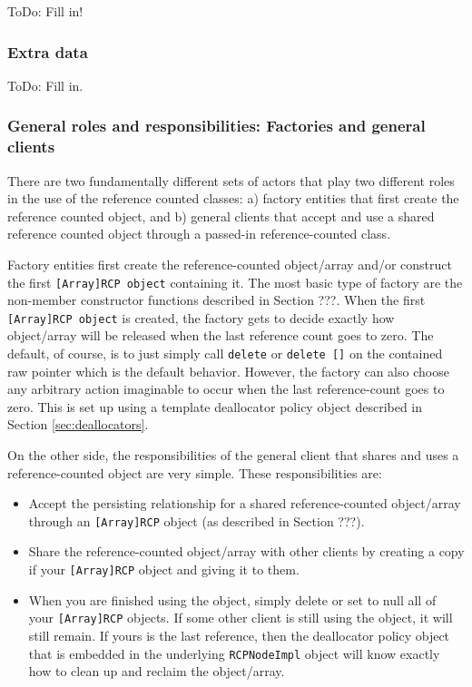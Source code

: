 \documentclass[pdf,ps2pdf,11pt]{SANDreport}
\begin{document}
ToDo: Fill in!


%
{}\subsubsection{Extra data}
\label{sec:extra-data}
%

ToDo: Fill in.


%
{}\subsubsection{General roles and responsibilities: Factories and
general clients}
%

There are two fundamentally different sets of actors that play two
different roles in the use of the reference counted classes: a)
factory entities that first create the reference counted object, and
b) general clients that accept and use a shared reference counted
object through a passed-in reference-counted class.

Factory entities first create the reference-counted object/array
and/or construct the first {}\texttt{[Array]RCP object} containing it.
The most basic type of factory are the non-member constructor
functions described in Section ???.  When the first
{}\texttt{[Array]RCP object} is created, the factory gets to decide
exactly how object/array will be released when the last reference
count goes to zero.  The default, of course, is to just simply call
{}\texttt{delete} or {}\texttt{delete []} on the contained raw pointer
which is the default behavior.  However, the factory can also choose
any arbitrary action imaginable to occur when the last reference-count
goes to zero.  This is set up using a template deallocator policy
object described in Section {}\ref{sec:deallocators}.

On the other side, the responsibilities of the general client that
shares and uses a reference-counted object are very simple.  These
responsibilities are:

\begin{itemize}

{}\item Accept the persisting relationship for a shared
reference-counted object/array through an {}\texttt{[Array]RCP} object
(as described in Section ???).

{}\item Share the reference-counted object/array with other clients by
creating a copy if your {}\texttt{[Array]RCP} object and giving it to
them.

{}\item When you are finished using the object, simply delete or set
to null all of your {}\texttt{[Array]RCP} objects.  If some other
client is still using the object, it will still remain.  If yours is
the last reference, then the deallocator policy object that is
embedded in the underlying {}\texttt{RCPNodeImpl} object will know
exactly how to clean up and reclaim the object/array.

\end{itemize}
\end{document}
